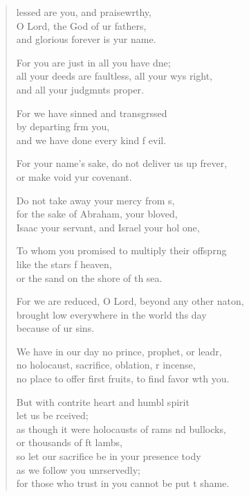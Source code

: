 \settowidth{\versewidth}{no place to offer first fruits, to find favor with you.}
\begin{verse}%
  \begin{patverse}
lessed are you, and praisewrthy,\Flex\\
O Lord, the God of ur fathers,\Med\\
and glorious forever is yur name.

For you are just in all you have dne;\Flex\\
all your deeds are faultless, all your wys right,\Med\\
and all your judgmnts proper.

For we have sinned and transgrssed\Flex\\
by departing frm you,\Med\\
and we have done every kind f evil.

For your name’s sake, do not deliver us up frever,\Med\\
or make void yur covenant.

Do not take away your mercy from s,\Flex\\
for the sake of Abraham, your bloved,\Med\\
Isaac your servant, and Israel your hol one,

To whom you promised to multiply their offspr\pointup{\i}ng\Flex\\
like the stars f heaven,\Med\\
or the sand on the shore of th sea.

For we are reduced, O Lord, beyond any other nat\pointup{\i}on,\Flex\\
brought low everywhere in the world th\pointup{\i}s day\Med\\
because of ur sins.

We have in our day no prince, prophet, or leadr,\Flex\\
no holocaust, sacrifice, oblation, r incense,\Med\\
no place to offer first fruits, to find favor w\pointup{\i}th you.

But with contrite heart and humbl spirit\Med\\
let us be rceived;\\
as though it were holocausts of rams nd bullocks,\Med\\
or thousands of ft lambs,\\
so let our sacrifice be in your presence tody\Flex\\
as we follow you unrservedly;\Med\\
for those who trust in you cannot be put t shame.


\end{patverse}
\end{verse}
